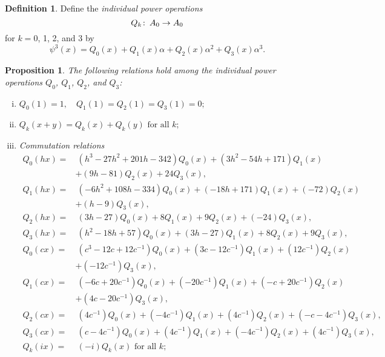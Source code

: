\documentclass{gtpart}
\newtheorem{prop}[thm]{Proposition}
\theoremstyle{definition}
\newtheorem{defn}[thm]{Definition}
\theoremstyle{remark}
\def\co{\colon\thinspace}
\newcommand{\A}{\alpha}
\newcommand{\p}{\psi^3}
\begin{document}
\begin{defn}
 Define the {\em individual power operations} 
 \[
  Q_k \co A_0 \to A_0 
 \]
 for $k = 0$, 1, 2, and 3 by 
 \begin{equation}
 \label{Q_k}
  \p (x) = Q_0(x) + Q_1(x) \A + Q_2(x) \A^2 + Q_3(x) \A^3.  
 \end{equation}
\end{defn}

\begin{prop}
\label{prop:Q}
 The following relations hold among the individual power operations 
 $Q_0$, $Q_1$, $Q_2$, and $Q_3$: 
 \begin{enumerate}[(i)]
  \item \label{Q(i)} $Q_0(1) = 1, \quad Q_1(1) = Q_2(1) = Q_3(1) = 0;$ 

  \item \label{Q(ii)} $Q_k(x+y) = Q_k(x) + Q_k(y) \text{~for all~} k;$ 

  \item \label{Q(iii)} {\em Commutation relations }
  \begin{equation*}
  \begin{split}
   Q_0(h x) = & ~ (h^3 - 27 h^2 + 201 h - 342) Q_0(x) + (3 h^2 - 54 h + 171) Q_1(x) \qquad \qquad \\
              & + (9 h - 81) Q_2(x) + 24 Q_3(x), \\
   Q_1(h x) = & ~ (-6 h^2 + 108 h - 334) Q_0(x) + (-18 h + 171) Q_1(x) + (-72) Q_2(x) \\
              & + (h - 9) Q_3(x), \\
   Q_2(h x) = & ~ (3 h - 27) Q_0(x) + 8 Q_1(x) + 9 Q_2(x) + (-24) Q_3(x), \\
   Q_3(h x) = & ~ (h^2 - 18 h + 57) Q_0(x) + (3 h - 27) Q_1(x) + 8 Q_2(x) + 9 Q_3(x), \\
   Q_0(c x) = & ~ (c^3 - 12 c + 12 c^{-1}) Q_0(x) + (3 c - 12 c^{-1}) Q_1(x) + (12 c^{-1}) Q_2(x) \\
              & + (-12 c^{-1}) Q_3(x), \\
   Q_1(c x) = & ~ (-6 c + 20 c^{-1}) Q_0(x) + (-20 c^{-1}) Q_1(x) + (- c + 20 c^{-1}) Q_2(x) \\
              & + (4 c - 20 c^{-1}) Q_3(x), \\
   Q_2(c x) = & ~ (4 c^{-1}) Q_0(x) + (-4 c^{-1}) Q_1(x) + (4 c^{-1}) Q_2(x) + (- c - 4 c^{-1}) Q_3(x), \\
   Q_3(c x) = & ~ (c - 4 c^{-1}) Q_0(x) + (4 c^{-1}) Q_1(x) + (-4 c^{-1}) Q_2(x) + (4 c^{-1}) Q_3(x), \\
   Q_k(i x) = & ~ (-i) Q_k(x) \text{~for all~} k; \\
  \end{split}
  \end{equation*}


\end{enumerate}
\end{prop}
\end{document}

